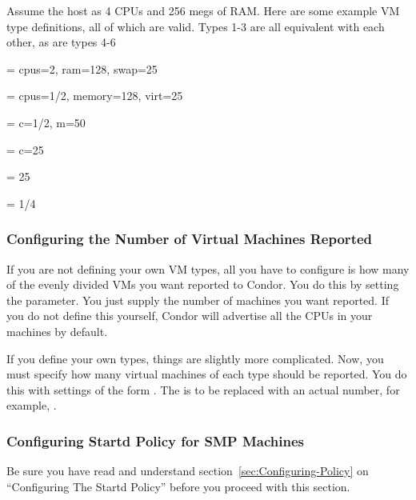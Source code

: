 Assume the host as 4 CPUs and 256 megs of RAM.
Here are some example VM type definitions, all of which are valid. 
Types 1-3 are all equivalent with each other, as are types 4-6

 = cpus=2, ram=128, swap=25%

 = cpus=1/2, memory=128, virt=25%

 = c=1/2, m=50%

 = c=25%

 = 25%

 = 1/4


\subsubsection{\label{sec:Config-VM-Number}
Configuring the Number of Virtual Machines Reported}

If you are not defining your own VM types, all you have to configure
is how many of the evenly divided VMs you want reported to Condor.
You do this by setting the  parameter.
You just supply the number of machines you want reported.
If you do not define this yourself, Condor will advertise all the CPUs
in your machines by default.

If you define your own types, things are slightly more complicated.  
Now, you must specify how many virtual machines of each type should be
reported.
You do this with settings of the form
.
The  is to be replaced with an actual number, for example, 
. 


\subsubsection{\label{sec:Config-SMP-Policy}
Configuring Startd Policy for SMP Machines}

\Note Be sure you have read and understand
section~\ref{sec:Configuring-Policy} on ``Configuring The Startd
Policy'' before you proceed with this section.

